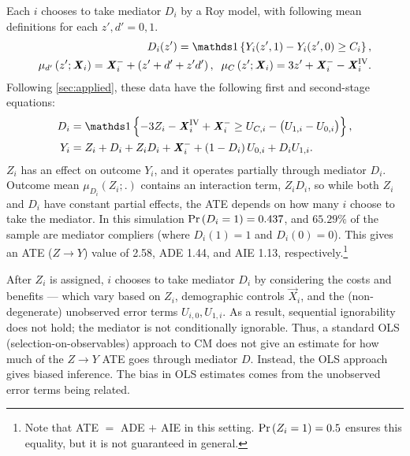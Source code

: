 Each $i$ chooses to take mediator $D_i$ by a Roy model, with following mean definitions for each $z', d' = 0, 1$.
\begin{align*}
    D_i(z') = \indicator{Y_i(z', 1) - Y_i(z', 0) \geq C_i},  \\
    \mu_{d'}\left(z' ; \vec X_i \right) = \vec X_i^- + \left( z' + d' + z' d' \right),
    \;\; \mu_{C}\left(z' ; \vec X_i \right) = 3z' + \vec X_i^- - \vec X_i^{\text{IV}}.
\end{align*}
Following \autoref{sec:applied}, these data have the following first and second-stage equations:
\begin{align*}
    D_i &= \indicator{-3Z_i - \vec X_i^{\text{IV}} + \vec X_i^-
        \geq U_{C,i} - \big( U_{1,i} - U_{0,i} \big)},  \\
    Y_i &= Z_i + D_i + Z_i D_i + \vec X_i^-
        + \left( 1 - D_i \right) U_{0,i} + D_i U_{1,i}.
\end{align*}
$Z_i$ has an effect on outcome $Y_i$, and it operates partially through mediator $D_i$.
Outcome mean $\mu_{D_i}(Z_i;.)$ contains an interaction term, $Z_i D_i$, so while both $Z_i$ and $D_i$ have constant partial effects, the ATE depends on how many $i$ choose to take the mediator.
In this simulation $\Pr\left( D_i = 1 \right) = 0.437$, and $65.29\%$ of the sample are mediator compliers (where $D_i(1)=1$ and $D_i(0) = 0$).
This gives an ATE ($Z\to Y$) value of 2.58, ADE 1.44, and AIE 1.13, respectively.\footnote{
    Note that ATE $=$ ADE $+$ AIE in this setting.
    $\Pr\left( Z_i=1 \right) = 0.5$ ensures this equality, but it is not guaranteed in general.
}

After $Z_i$ is assigned, $i$ chooses to take mediator $D_i$ by considering the costs and benefits --- which vary based on $Z_i$, demographic controls $\vec X_i$, and the (non-degenerate) unobserved error terms $U_{i,0}, U_{1,i}$.
As a result, sequential ignorability does not hold; the mediator is not conditionally ignorable.
Thus, a standard OLS (selection-on-observables) approach to CM does not give an estimate for how much of the $Z \to Y$ ATE goes through mediator $D$.
Instead, the OLS approach gives biased inference.
The bias in OLS estimates comes from the unobserved error terms being related.


